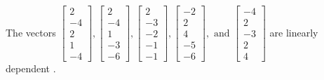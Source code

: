 \begin{exercise}
\begin{exerciseStatement}
  \end{exerciseStatement}
  \begin{exerciseAnswer}
   The vectors \(\left[\begin{array}{r}
2 \\
-4 \\
2 \\
1 \\
-4
\end{array}\right] , \left[\begin{array}{r}
2 \\
-4 \\
1 \\
-3 \\
-6
\end{array}\right] , \left[\begin{array}{r}
2 \\
-3 \\
-2 \\
-1 \\
-1
\end{array}\right] , \left[\begin{array}{r}
-2 \\
2 \\
4 \\
-5 \\
-6
\end{array}\right] , \text{ and } \left[\begin{array}{r}
-4 \\
2 \\
-3 \\
2 \\
4
\end{array}\right]\) are 
  	 linearly dependent  .
  


  \end{exerciseAnswer}
\end{exercise}